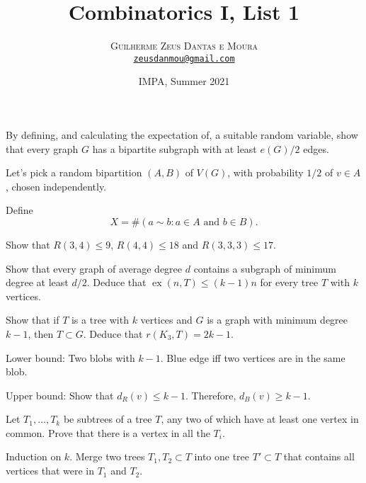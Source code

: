 \documentclass[10pt, a4paper]{article}
\title{\textbf{\textsf{Combinatorics I, List 1}}}
\author{\textsc{Guilherme Zeus Dantas e Moura}\\[2pt]\href{mailto:zeusdanmou@gmail.com}{\texttt{zeusdanmou@gmail.com}}}
\date{IMPA, Summer 2021}
\DeclareMathOperator\ex{ex}
\begin{document}
\maketitle

\begin{prob}
	By defining, and calculating the expectation of, a suitable random variable, show that every graph $G$ has a bipartite subgraph with at least $e(G)/2$ edges.
\end{prob}
\begin{sk}
	Let's pick a random bipartition $(A, B)$ of $V(G)$, with probability $1/2$ of $v \in A$, chosen independently.

	Define \[
		X = \#\left( a \sim b : a \in A \text{ and } b \in B\right).
	\]
\end{sk}

\newpage
\begin{prob}
	Show that $R(3, 4) \leqslant 9$, $R(4, 4) \leqslant 18$ and $R(3, 3, 3) \leqslant 17$.
\end{prob}
\begin{sol}
	
\end{sol}

\newpage
\begin{prob}
	Show that every graph of average degree $d$ contains a subgraph of minimum degree at least $d/2$. Deduce that  $\ex(n, T) \leqslant (k-1)n$ for every tree $T$ with $k$ vertices.
\end{prob}
\begin{sol}
	
\end{sol}

\newpage
\begin{prob}
	Show that if $T$ is a tree with $k$ vertices and $G$ is a graph with minimum degree $k-1$, then $T \subset G$. Deduce that $r(K_3, T) = 2k-1$.
\end{prob}
\begin{sk}
	Lower bound: Two blobs with $k-1$. Blue edge iff two vertices are in the same blob.

	Upper bound: Show that $d_R(v) \le k - 1$. Therefore,  $d_B(v) \ge k -1$.
\end{sk}

\newpage
\begin{prob}
	Let $T_1, \dots, T_k$ be subtrees of a tree $T$, any two of which have at least one vertex in common. Prove that there is a vertex in all the $T_i$.
\end{prob}
\begin{sk}
	Induction on $k$. Merge two trees $T_1, T_2 \subset T$ into one tree $T' \subset T$ that contains all vertices that were in $T_1$ and $T_2$.
\end{sk}
\end{document}
